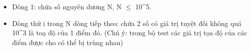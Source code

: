 \begin{itemize}
	\item     Dòng 1: chứa số nguyên dương N, N $\le$ 10^5.   
	\item     Dòng thứ i trong N dòng tiếp theo: chứa 2 số có giá trị tuyệt đối không quá 10^3 là toạ độ của 1 điểm đỏ. (Chú ý: trong bộ test các giá trị tọa độ của các điểm được cho có thể bị trùng nhau)   
\end{itemize}